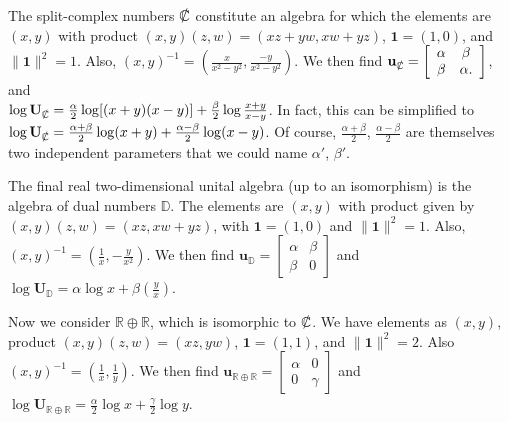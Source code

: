 \documentclass{amsart}
\numberwithin{equation}{section}
\theoremstyle{definition}
\numberwithin{theorem}{section}
\begin{document}
The split-complex numbers $\slashed{\mathbb{C}}$ constitute an algebra for which the elements are  $(x,y)$ with product $(x,y)(z,w) = (xz+yw,xw+yz)$, $ \mathbf{1} = (1,0)$, and $\|\mathbf{1}\|^2 = 1$.  Also, $(x,y)^{-1} = (\frac{x}{x^2-y^2},\frac{-y}{x^2-y^2})$. \hspace{1cm}  We then find $\mathbf{u}_{\slashed{\mathbb{C}}} = \left[\begin{array}{ccc}
 \alpha & \beta   \\ 
 \beta & \alpha.    
\end{array}\right]$, \hspace{.5cm} and \hfill \\ $\log  \mathbf{U}_{\slashed{\mathbb{C}}} = \frac{\alpha}{2}\log[(x+
y)(x-y)] +  \frac{\beta}{2}\log \frac{x+y}{x-y}$.  In fact, this can be simplified to $\log  \mathbf{U}_{\slashed{\mathbb{C}}} = \frac{\alpha+\beta}{2}\log(x+y) + \frac{\alpha-\beta}{2}\log(x-y)$.  Of course, $\frac{\alpha+\beta}{2}$, $\frac{\alpha-\beta}{2}$ are themselves two independent parameters that we could name $\alpha'$, $\beta'$.

The final real two-dimensional unital algebra (up to an isomorphism) is the algebra of dual numbers $\mathbb{D}$.  The elements are $(x,y)$ with product given by $(x,y)(z,w) = (xz,xw+yz)$, with $\mathbf{1}=(1,0)$ and $\|\mathbf{1}\|^2 = 1$. Also, $(x,y)^{-1} = (\frac{1}{x},-\frac{y}{x^2})$.  We then find $\mathbf{u}_\mathbb{D} = \left[\begin{array}{ccc}
 \alpha & \beta   \\ 
 \beta & 0    
\end{array}\right]$ and $\log  \mathbf{U}_{\mathbb{D}} = \alpha\log x + \beta\left(\frac{y}{x}\right)$. 
   
   Now we consider $\mathbb{R}\oplus\mathbb{R}$, which is isomorphic to $\slashed{\mathbb{C}}$.  We have elements as $(x,y)$, product $(x,y)(z,w) = (xz,yw)$, $\mathbf{1}=(1,1)$, and $\|\mathbf{1}\|^2 = 2$.  Also $(x,y)^{-1} = (\frac{1}{x},\frac{1}{y})$.  We then find $\mathbf{u}_{\mathbb{R}\oplus\mathbb{R}} = \left[\begin{array}{ccc}
 \alpha & 0   \\ 
 0 & \gamma    
\end{array}\right]$ and $\log  \mathbf{U}_{\mathbb{R}\oplus\mathbb{R}} = \frac{\alpha}{2}\log x + \frac{\gamma}{2}\log y$. 
\end{document}
